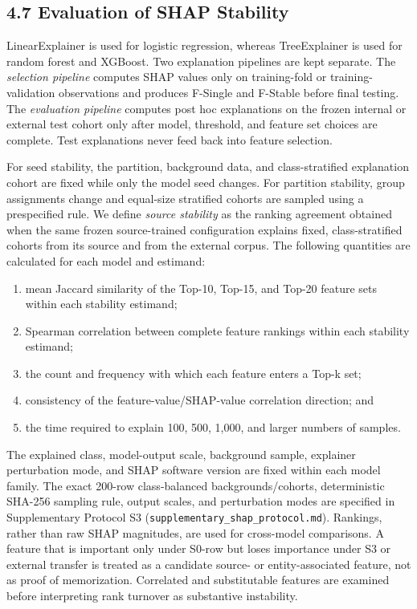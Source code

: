 \documentclass[
  10pt,
]{article}
\providecommand{\tightlist}{%
  \setlength{\itemsep}{0pt}\setlength{\parskip}{0pt}}
\begin{document}
\subsection{4.7 Evaluation of SHAP
Stability}\label{evaluation-of-shap-stability}

LinearExplainer is used for logistic regression, whereas TreeExplainer
is used for random forest and XGBoost. Two explanation pipelines are
kept separate. The \emph{selection pipeline} computes SHAP values only
on training-fold or training-validation observations and produces
F-Single and F-Stable before final testing. The \emph{evaluation
pipeline} computes post hoc explanations on the frozen internal or
external test cohort only after model, threshold, and feature set
choices are complete. Test explanations never feed back into feature
selection.

For seed stability, the partition, background data, and class-stratified
explanation cohort are fixed while only the model seed changes. For
partition stability, group assignments change and equal-size stratified
cohorts are sampled using a prespecified rule. We define \emph{source
stability} as the ranking agreement obtained when the same frozen
source-trained configuration explains fixed, class-stratified cohorts
from its source and from the external corpus. The following quantities
are calculated for each model and estimand:

\begin{enumerate}
\def\labelenumi{\arabic{enumi}.}
\tightlist
\item
  mean Jaccard similarity of the Top-10, Top-15, and Top-20 feature sets
  within each stability estimand;
\item
  Spearman correlation between complete feature rankings within each
  stability estimand;
\item
  the count and frequency with which each feature enters a Top-k set;
\item
  consistency of the feature-value/SHAP-value correlation direction; and
\item
  the time required to explain 100, 500, 1,000, and larger numbers of
  samples.
\end{enumerate}

The explained class, model-output scale, background sample, explainer
perturbation mode, and SHAP software version are fixed within each model
family. The exact 200-row class-balanced backgrounds/cohorts,
deterministic SHA-256 sampling rule, output scales, and perturbation
modes are specified in Supplementary Protocol S3
(\texttt{supplementary\_shap\_protocol.md}). Rankings, rather than raw
SHAP magnitudes, are used for cross-model comparisons. A feature that is
important only under S0-row but loses importance under S3 or external
transfer is treated as a candidate source- or entity-associated feature,
not as proof of memorization. Correlated and substitutable features are
examined before interpreting rank turnover as substantive instability.
\end{document}
